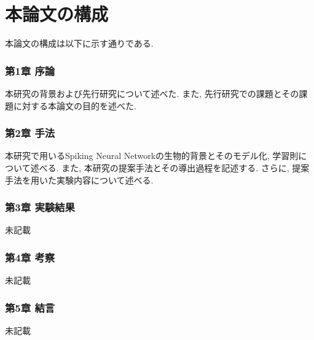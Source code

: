 \section{本論文の構成}
本論文の構成は以下に示す通りである.

\subsubsection{第1章 序論}
本研究の背景および先行研究について述べた.
また, 先行研究での課題とその課題に対する本論文の目的を述べた.

\subsubsection{第2章 手法}
本研究で用いるSpiking Neural Networkの生物的背景とそのモデル化, 学習則について述べる.
また, 本研究の提案手法とその導出過程を記述する.
さらに, 提案手法を用いた実験内容について述べる.

\subsubsection{第3章 実験結果}
未記載

\subsubsection{第4章 考察}
未記載

\subsubsection{第5章 結言}
未記載
